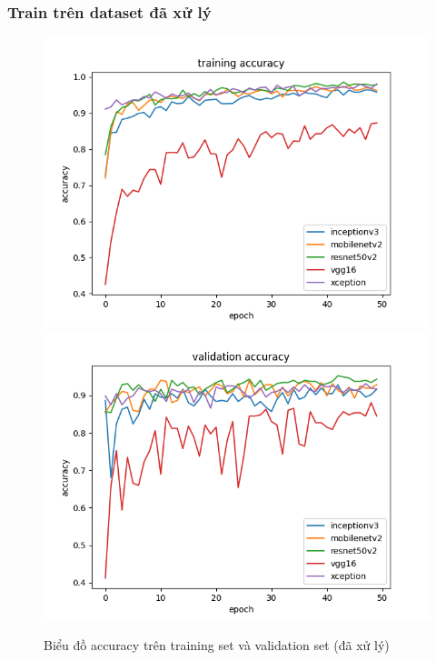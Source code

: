 \documentclass[a4paper,14pt]{extarticle}
\begin{document}
	\subsubsection{Train trên dataset đã xử lý}
		\begin{figure}[H]
			\centering
			\includegraphics[scale=0.45]{images/accuracy.png}
			\includegraphics[scale=0.45]{images/val_accuracy.png}
			\caption{Biểu đồ accuracy trên training set và validation set (đã xử lý)}
		\end{figure}
\end{document}
